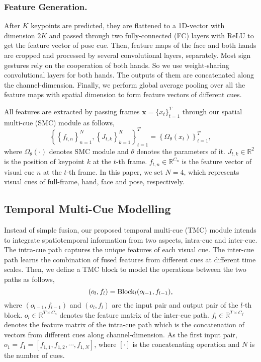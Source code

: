 \documentclass[letterpaper]{article} \usepackage{aaai20}  \usepackage{times}  \usepackage{helvet} \usepackage{courier}  \usepackage[hyphens]{url}  \usepackage{graphicx} \urlstyle{rm} \def\UrlFont{\rm}  \usepackage{graphicx}  \frenchspacing  \setlength{\pdfpagewidth}{8.5in}  \setlength{\pdfpageheight}{11in}
\begin{document}
\subsubsection{Feature Generation.}
After $K$ keypoints are predicted, they are flattened to a 1D-vector with dimension $2K$ and passed through two fully-connected (FC) layers with ReLU to get the feature vector of pose cue. Then, feature maps of the face and both hands are cropped and processed by several convolutional layers, separately. Most sign gestures rely on the cooperation of both hands. So we use weight-sharing convolutional layers for both hands. The outputs of them are concatenated along the channel-dimension. Finally, we perform global average pooling over all the feature maps with spatial dimension to form feature vectors of different cues.

All features are extracted by passing frames $\mathbf{x}=\{x_t\}_{t=1}^T$ through our spatial multi-cue (SMC) module as follows,
\begin{equation} \label{eq:smc}
    \left\{ \left\{f_{t,n}\right\}_{n=1}^N , \left\{J_{t,k}\right\}_{k=1}^K \right\}_{t=1}^T = \left\{ \Omega_\theta(x_t) \right\}_{t=1}^T,
\end{equation}
where \(\Omega_\theta(\cdot)\) denotes SMC module and $\theta$ denotes the parameters of it. $J_{t,k}\in\mathbb{R}^2$ is the position of keypoint $k$ at the $t$-th frame. $f_{t,n}\in\mathbb{R}^{C_n}$ is the feature vector of visual cue $n$ at the $t$-th frame. In this paper, we set $N=4$, which represents visual cues of full-frame, hand, face and pose, respectively. 


\subsection{Temporal Multi-Cue Modelling}
Instead of simple fusion, our proposed temporal multi-cue (TMC) module intends to integrate spatiotemporal information from two aspects, intra-cue and inter-cue. The intra-cue path captures the unique features of each visual cue. The inter-cue path learns the combination of fused features from different cues at different time scales. Then, we define a TMC block to model the operations between the two paths as follows,
\begin{equation}
    ({o_l,f_l}) = {\rm Block}_l({o_{l-1}, f_{l-1}}),
\end{equation}
where $(o_{l-1},f_{l-1})$ and $(o_l,f_l)$ are the input pair and output pair of the $l$-th block. 
$o_l\in\mathbb{R}^{T\times C_o}$ denotes the feature matrix of the inter-cue path. 
$f_l\in\mathbb{R}^{T\times C_f}$ denotes the feature matrix of the intra-cue path which is the concatenation of vectors from different cues along channel-dimension. 
As the first input pair, $o_1\!=\!f_1\!=\![f_{1,1}, f_{1,2}, \cdots, f_{1,N}]$, where $[\cdot]$ is the concatenating operation and $N$ is the number of cues. 
\end{document}
